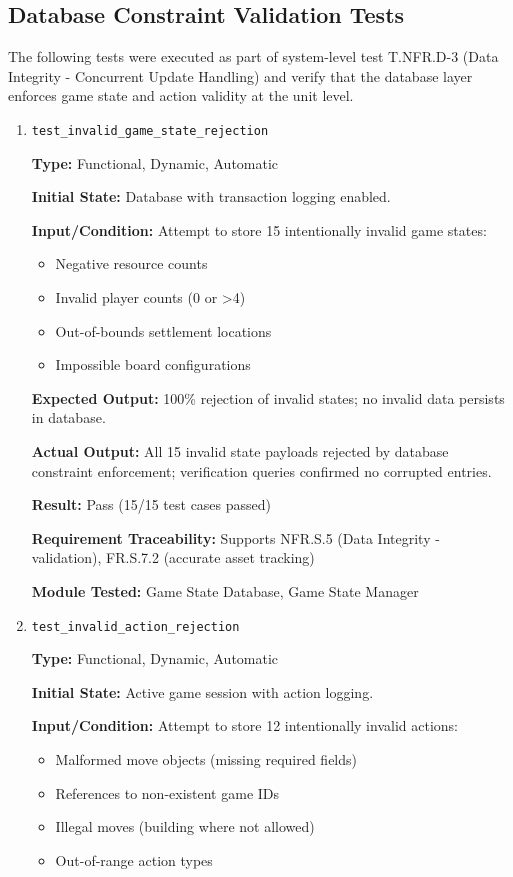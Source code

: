 \documentclass[12pt, titlepage]{article}
\begin{document}
\subsection{Database Constraint Validation Tests}

The following tests were executed as part of system-level test T.NFR.D-3 (Data Integrity - Concurrent Update Handling) and verify that the database layer enforces game state and action validity at the unit level.

\begin{enumerate}

\item \texttt{test\_invalid\_game\_state\_rejection}

\textbf{Type:} Functional, Dynamic, Automatic

\textbf{Initial State:} Database with transaction logging enabled.

\textbf{Input/Condition:} Attempt to store 15 intentionally invalid game states:
\begin{itemize}
    \item Negative resource counts
    \item Invalid player counts (0 or >4)
    \item Out-of-bounds settlement locations
    \item Impossible board configurations
\end{itemize}

\textbf{Expected Output:} 100\% rejection of invalid states; no invalid data persists in database.

\textbf{Actual Output:} All 15 invalid state payloads rejected by database constraint enforcement; verification queries confirmed no corrupted entries.

\textbf{Result:} Pass (15/15 test cases passed)

\textbf{Requirement Traceability:} Supports NFR.S.5 (Data Integrity - validation), FR.S.7.2 (accurate asset tracking)

\textbf{Module Tested:} Game State Database, Game State Manager


\item \texttt{test\_invalid\_action\_rejection}

\textbf{Type:} Functional, Dynamic, Automatic

\textbf{Initial State:} Active game session with action logging.

\textbf{Input/Condition:} Attempt to store 12 intentionally invalid actions:
\begin{itemize}
    \item Malformed move objects (missing required fields)
    \item References to non-existent game IDs
    \item Illegal moves (building where not allowed)
    \item Out-of-range action types
\end{itemize}


\end{enumerate}
\end{document}
